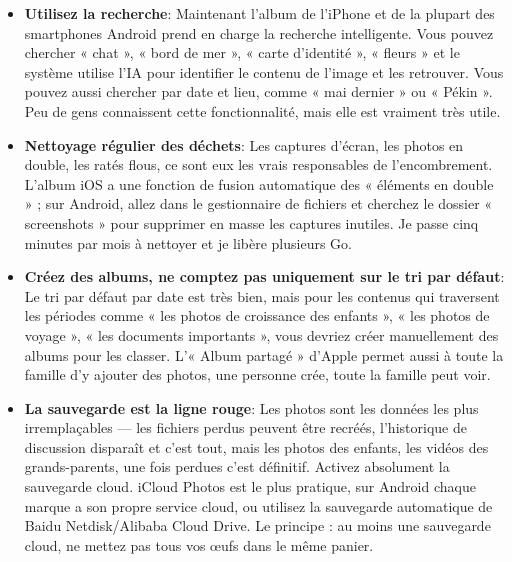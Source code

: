 \begin{itemize}
  \item \textbf{Utilisez la recherche}: Maintenant l'album de l'iPhone et de la plupart des smartphones Android prend en charge la recherche intelligente. Vous pouvez chercher « chat », « bord de mer », « carte d'identité », « fleurs » et le système utilise l'IA pour identifier le contenu de l'image et les retrouver. Vous pouvez aussi chercher par date et lieu, comme « mai dernier » ou « Pékin ». Peu de gens connaissent cette fonctionnalité, mais elle est vraiment très utile.
  \item \textbf{Nettoyage régulier des déchets}: Les captures d'écran, les photos en double, les ratés flous, ce sont eux les vrais responsables de l'encombrement. L'album iOS a une fonction de fusion automatique des « éléments en double » ; sur Android, allez dans le gestionnaire de fichiers et cherchez le dossier « screenshots » pour supprimer en masse les captures inutiles. Je passe cinq minutes par mois à nettoyer et je libère plusieurs Go.
  \item \textbf{Créez des albums, ne comptez pas uniquement sur le tri par défaut}: Le tri par défaut par date est très bien, mais pour les contenus qui traversent les périodes comme « les photos de croissance des enfants », « les photos de voyage », « les documents importants », vous devriez créer manuellement des albums pour les classer. L'« Album partagé » d'Apple permet aussi à toute la famille d'y ajouter des photos, une personne crée, toute la famille peut voir.
  \item \textbf{La sauvegarde est la ligne rouge}: Les photos sont les données les plus irremplaçables — les fichiers perdus peuvent être recréés, l'historique de discussion disparaît et c'est tout, mais les photos des enfants, les vidéos des grands-parents, une fois perdues c'est définitif. Activez absolument la sauvegarde cloud. iCloud Photos est le plus pratique, sur Android chaque marque a son propre service cloud, ou utilisez la sauvegarde automatique de Baidu Netdisk/Alibaba Cloud Drive. Le principe : au moins une sauvegarde cloud, ne mettez pas tous vos œufs dans le même panier.
\end{itemize}



